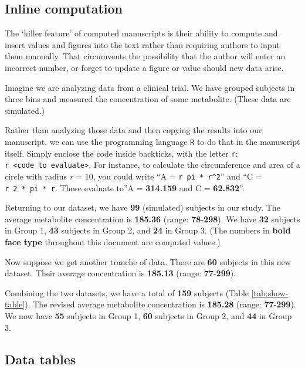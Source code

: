 \documentclass[smallextended]{svjour3}       %
\begin{document}
\hypertarget{sec:1}{%
\subsection{Inline computation}\label{sec:1}}

The `killer feature' of computed manuscripts is their ability to compute and insert values and figures into the text rather than requiring authors to input them manually. That circumvents the possibility that the author will enter an incorrect number, or forget to update a figure or value should new data arise.

Imagine we are analyzing data from a clinical trial. We have grouped subjects in three bins and measured the concentration of some metabolite. (These data are simulated.)

Rather than analyzing those data and then copying the results into our manuscript, we can use the programming language \texttt{R} to do that in the manuscript itself. Simply enclose the code inside backticks, with the letter \texttt{r}: \texttt{\textasciigrave{}r\ \textless{}code\ to\ evaluate\textgreater{}\textasciigrave{}}. For instance, to calculate the circumference and area of a circle with radius \emph{r} = 10, you could write ``A = \texttt{\textasciigrave{}r\ pi\ *\ r\^{}2\textasciigrave{}}'' and ``C = \texttt{\textasciigrave{}r\ 2\ *\ pi\ *\ r\textasciigrave{}}. Those evaluate to''A = \textbf{314.159} and C = \textbf{62.832}''.

Returning to our dataset, we have \textbf{99} (simulated) subjects in our study. The average metabolite concentration is \textbf{185.36} (range: \textbf{78}-\textbf{298}). We have \textbf{32} subjects in Group 1, \textbf{43} subjects in Group 2, and \textbf{24} in Group 3. (The numbers in \textbf{bold face type} throughout this document are computed values.)

Now suppose we get another tranche of data. There are \textbf{60} subjects in this new dataset. Their average concentration is \textbf{185.13} (range: \textbf{77}-\textbf{299}).

Combining the two datasets, we have a total of \textbf{159} subjects (Table \ref{tab:show-table}). The revised average metabolite concentration is \textbf{185.28} (range: \textbf{77}-\textbf{299}). We now have \textbf{55} subjects in Group 1, \textbf{60} subjects in Group 2, and \textbf{44} in Group 3.

\hypertarget{sec:2}{%
\subsection{Data tables}\label{sec:2}}
\end{document}
